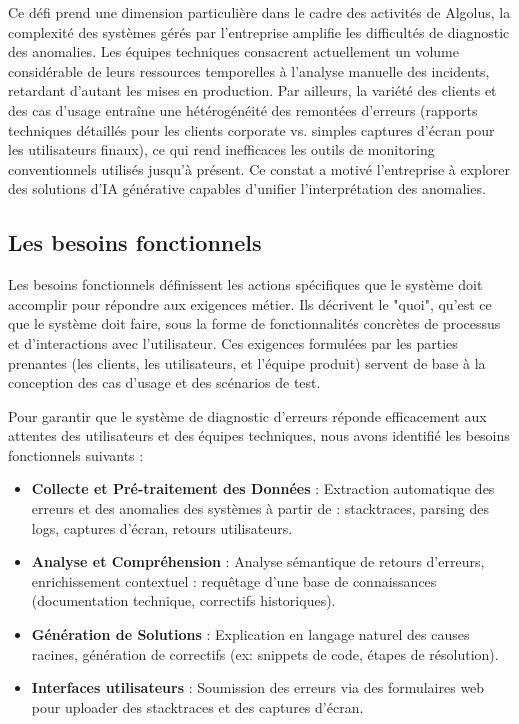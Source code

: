 \documentclass[12pt,a4paper]{report}
\begin{document}
	Ce défi prend une dimension particulière dans le cadre des activités de Algolus, la complexité des systèmes gérés par l'entreprise amplifie les difficultés de diagnostic des anomalies. Les équipes techniques consacrent actuellement un volume considérable de leurs ressources temporelles à l'analyse manuelle des incidents, retardant d'autant les mises en production. Par ailleurs, la variété des clients et des cas d'usage entraîne une hétérogénéité des remontées d'erreurs (rapports techniques détaillés pour les clients corporate vs. simples captures d'écran pour les utilisateurs finaux), ce qui rend inefficaces les outils de monitoring conventionnels utilisés jusqu'à présent. Ce constat a motivé l'entreprise à explorer des solutions d'IA générative capables d'unifier l'interprétation des anomalies.
	
	\subsection{Les besoins fonctionnels}
	
	Les besoins fonctionnels définissent les actions spécifiques que le système doit accomplir pour répondre aux exigences métier. Ils décrivent le "quoi", qu'est ce que le système doit faire, sous la forme de fonctionnalités concrètes de processus et d'interactions avec l'utilisateur. Ces exigences formulées par les parties prenantes  (les clients, les utilisateurs, et l'équipe produit) servent de base à la conception des cas d’usage et des scénarios de test.
	
	Pour garantir que le système de diagnostic d’erreurs réponde efficacement aux attentes des utilisateurs et des équipes techniques, nous avons identifié les besoins fonctionnels suivants :
	
	\begin{itemize}
		
		\item \textbf{Collecte et Pré-traitement des Données} : Extraction automatique des erreurs et des anomalies des systèmes à partir de :
		stacktraces, parsing des logs, captures d’écran, retours utilisateurs.
		
		\item \textbf{Analyse et Compréhension} : Analyse sémantique de retours d’erreurs, enrichissement contextuel : requêtage d’une base de connaissances (documentation technique, correctifs historiques).
		
		\item \textbf{Génération de Solutions} : Explication en langage naturel des causes racines, génération de correctifs (ex: snippets de code, étapes de résolution).
		
		\item \textbf{Interfaces utilisateurs} : Soumission des erreurs via des formulaires web pour uploader des stacktraces et des captures d'écran.
		
	\end{itemize}
	
\end{document}
